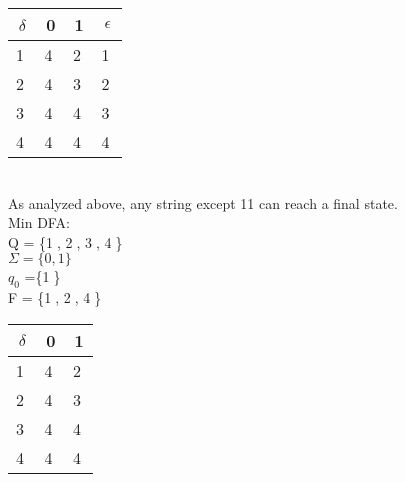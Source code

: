 \documentclass[a4paper]{article}
\begin{document}
\begin{tabular}{|c|c|c|c|}
\hline
$\delta$ & 0 & 1 & $\epsilon$  \\ 
\hline
\textcircled{1} &  \textcircled{4} & \textcircled{2} & \textcircled{1} \\
\hline
\textcircled{2} &  \textcircled{4} & \textcircled{3} & \textcircled{2} \\
\hline
\textcircled{3} &  \textcircled{4} & \textcircled{4} & \textcircled{3} \\
\hline
\textcircled{4} &  \textcircled{4} & \textcircled{4} & \textcircled{4} \\
\hline
\end{tabular}\\
As analyzed above, any string except 11 can reach a final state.\\
Min DFA:\\
Q = \{\textcircled{1}, \textcircled{2}, \textcircled{3}, \textcircled{4}\}\\
$\Sigma = \{0, 1\}$\\
$q_{0}$ =\{\textcircled{1}\}\\
F = \{\textcircled{1}, \textcircled{2}, \textcircled{4}\}\\

\begin{tabular}{|c|c|c|}
\hline
$\delta$ & 0 & 1  \\ 
\hline
\textcircled{1} &  \textcircled{4} & \textcircled{2} \\
\hline
\textcircled{2} &  \textcircled{4} & \textcircled{3} \\
\hline
\textcircled{3} &  \textcircled{4} & \textcircled{4} \\
\hline
\textcircled{4} &  \textcircled{4} & \textcircled{4} \\
\hline
\end{tabular}\\
\end{document}
